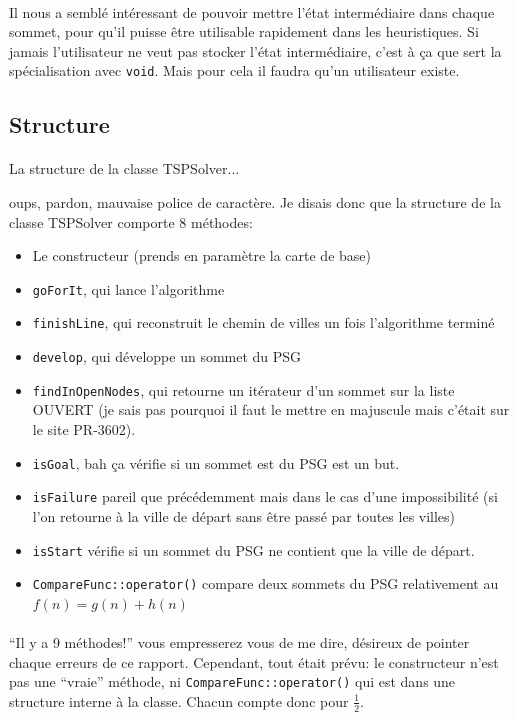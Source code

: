 \documentclass[french]{article}
\begin{document}
\paragraph{} Il nous a semblé intéressant de pouvoir mettre l'état
intermédiaire dans chaque sommet, pour qu'il puisse être utilisable rapidement
dans les heuristiques. Si jamais l'utilisateur ne veut pas stocker l'état
intermédiaire, c'est à ça que sert la spécialisation avec
\texttt{void}. Mais pour cela il faudra qu'un utilisateur existe.

\subsection{Structure}

{ \paragraph{} La structure de la classe TSPSolver...}
oups, pardon, mauvaise police de caractère. Je disais donc que la structure de
la classe TSPSolver comporte 8 méthodes:

\begin{itemize}
	\item Le constructeur (prends en paramètre la carte de base)
	\item \texttt{goForIt}, qui lance l'algorithme
	\item \texttt{finishLine}, qui reconstruit le chemin de villes un fois l'algorithme terminé
	\item \texttt{develop}, qui développe un sommet du PSG
	\item \texttt{findInOpenNodes}, qui retourne un itérateur d'un sommet sur
		la liste OUVERT (je sais pas pourquoi il faut le mettre en majuscule
		mais c'était sur le site PR-3602).
	\item \texttt{isGoal}, bah ça vérifie si un sommet est du PSG est un but.
	\item \texttt{isFailure} pareil que précédemment mais dans le cas d'une
		impossibilité (si l'on retourne à la ville de départ sans être passé
		par toutes les villes)
	\item \texttt{isStart} vérifie si un sommet du PSG ne contient que la ville
		de départ.
	\item \texttt{CompareFunc::operator()} compare deux sommets du PSG
		relativement au $f(n) = g(n) + h(n)$
\end{itemize}

\paragraph{} ``Il y a 9 méthodes!'' vous empresserez vous de me dire, désireux
de pointer chaque erreurs de ce rapport. Cependant, tout était prévu: le
constructeur n'est pas une ``vraie'' méthode, ni
\texttt{CompareFunc::operator()} qui est dans une structure interne à
la classe. Chacun compte donc pour $\frac{1}{2}$.
\end{document}
